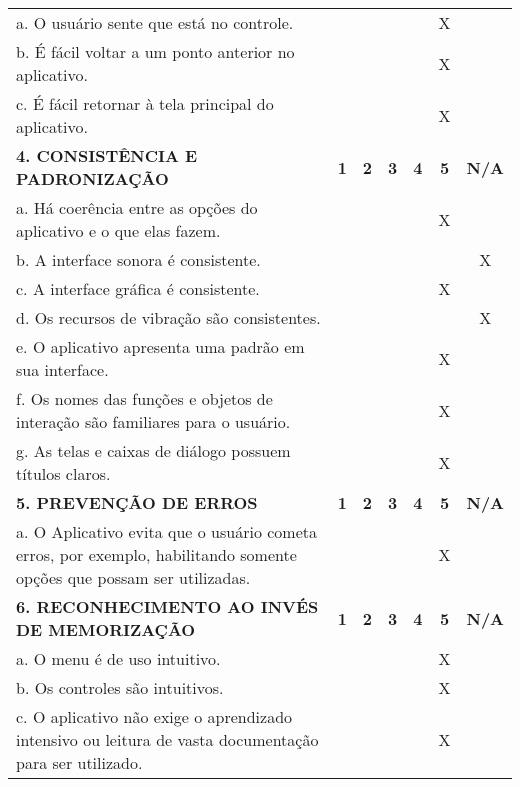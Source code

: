 \documentclass[portuguese,oneside]{tcc}
\begin{document}
\begin{center}
\begin{longtabu}{|L{25em}|c|c|c|c|c|c|}
																												a. O usuário sente que está no controle. & & & & & X & \\ 
																												b. É fácil voltar a um ponto anterior no aplicativo. & & & & & X & \\ 
																												c. É fácil retornar à tela principal do aplicativo. & & & & & X & \\ 
																												\textbf{4. CONSISTÊNCIA E PADRONIZAÇÃO} & \textbf{1} & \textbf{2} & \textbf{3} & \textbf{4} & \textbf{5} & \textbf{N/A} \\ 
																												a. Há coerência entre as opções do aplicativo e o que elas fazem. & & & & & X & \\ 
																												b. A interface sonora é consistente. & & & & & & X \\ 
																												c. A interface gráfica é consistente. & & & & & X & \\ 
																												d. Os recursos de vibração são consistentes. & & & & & & X \\ 
																												e. O aplicativo apresenta uma padrão em sua interface. & & & & & X & \\ 
																												f. Os nomes das funções e objetos de interação são familiares para o usuário. & & & & & X & \\ 
																												g. As telas e caixas de diálogo possuem títulos claros. & & & & & X & \\ 
																												\textbf{5. PREVENÇÃO DE ERROS} & \textbf{1} & \textbf{2} & \textbf{3} & \textbf{4} & \textbf{5} & \textbf{N/A} \\ 
																												a. O Aplicativo evita que o usuário cometa erros, por exemplo, habilitando somente opções que possam ser utilizadas. & & & & & X & \\ 
																												\textbf{6. RECONHECIMENTO AO INVÉS DE MEMORIZAÇÃO} & \textbf{1} & \textbf{2} & \textbf{3} & \textbf{4} & \textbf{5} & \textbf{N/A} \\ 
																												a. O  menu é de uso intuitivo. & & & & & X & \\ 
																												b. Os controles são intuitivos. & & & & & X & \\ 
																												c. O aplicativo não exige o aprendizado intensivo ou leitura de vasta documentação para ser utilizado. & & & & & X & \\ 

\end{longtabu}
\end{center}
\end{document}
